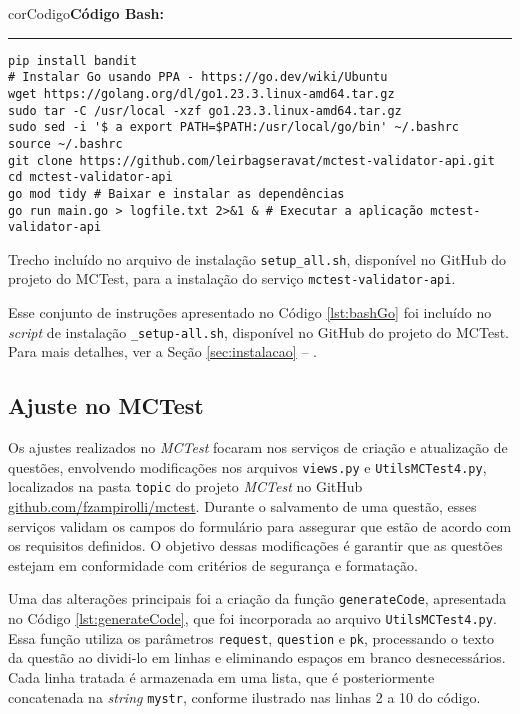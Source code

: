 \begin{listing}[!ht]
\begin{myboxCode}{corCodigo}{\textbf{Código Bash: }}\vspace{3mm}
\hrule
\begin{verbatim}
pip install bandit
# Instalar Go usando PPA - https://go.dev/wiki/Ubuntu
wget https://golang.org/dl/go1.23.3.linux-amd64.tar.gz
sudo tar -C /usr/local -xzf go1.23.3.linux-amd64.tar.gz
sudo sed -i '$ a export PATH=$PATH:/usr/local/go/bin' ~/.bashrc
source ~/.bashrc
git clone https://github.com/leirbagseravat/mctest-validator-api.git
cd mctest-validator-api
go mod tidy # Baixar e instalar as dependências
go run main.go > logfile.txt 2>&1 & # Executar a aplicação mctest-validator-api
\end{verbatim}
\end{myboxCode}
\caption{Trecho incluído no arquivo de instalação \texttt{setup\_all.sh}, disponível no GitHub do projeto do MCTest, para a instalação do serviço \texttt{mctest-validator-api}.}
\label{lst:bashGo}
\end{listing}

Esse conjunto de instruções apresentado no Código \ref{lst:bashGo} foi incluído no \textit{script} de instalação \texttt{\_setup-all.sh}, disponível no GitHub do projeto do MCTest. Para mais detalhes, ver a Seção \ref{sec:instalacao} -- .

\subsection{Ajuste no MCTest}\label{sec:contexto}

Os ajustes realizados no \textit{MCTest} focaram nos serviços de criação e atualização de questões, envolvendo modificações nos arquivos \texttt{views.py} e \texttt{UtilsMCTest4.py}, localizados na pasta \texttt{topic} do projeto \textit{MCTest} no GitHub \href{https://github.com/fzampirolli/mctest}{github.com/fzampirolli/mctest}. Durante o salvamento de uma questão, esses serviços validam os campos do formulário para assegurar que estão de acordo com os requisitos definidos. O objetivo dessas modificações é garantir que as questões estejam em conformidade com critérios de segurança e formatação.

Uma das alterações principais foi a criação da função \texttt{generateCode}, apresentada no Código \ref{lst:generateCode}, que foi incorporada ao arquivo \texttt{UtilsMCTest4.py}. Essa função utiliza os parâmetros \texttt{request}, \texttt{question} e \texttt{pk}, processando o texto da questão ao dividi-lo em linhas e eliminando espaços em branco desnecessários. Cada linha tratada é armazenada em uma lista, que é posteriormente concatenada na \textit{string} \texttt{mystr}, conforme ilustrado nas linhas 2 a 10 do código.

